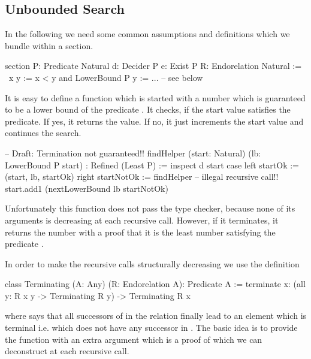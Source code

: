 \vskip 5mm
\subsection{Unbounded Search}

In the following we need some common assumptions and definitions which we
bundle within a section.

\begin{alba}
    section
        P: Predicate Natural
        d: Decider P
        e: Exist P
        R: Endorelation Natural :=
            \ x y := x < y and LowerBound P y
    :=
        ...  -- see below
\end{alba}

It is easy to define a function  which is started with a number
which is guaranteed to be a lower bound of the predicate . It checks, if
the start value satisfies the predicate. If yes, it returns the value. If no, it
just increments the start value and continues the search.
%
\begin{alba}
    -- Draft: Termination not guaranteed!!
    findHelper (start: Natural) (lb: LowerBound P start) : Refined (Least P) :=
        inspect d start case
            left startOk :=
                (start, lb, startOk)
            right startNotOk :=
                findHelper  -- illegal recursive call!!
                    start.add1
                    (nextLowerBound lb startNotOk)
\end{alba}
%
Unfortunately this function does not pass the type checker, because none of its
arguments is decreasing at each recursive call. However, if it terminates, it
returns the number with a proof that it is the least number satisfying the
predicate .

In order to make the recursive calls structurally decreasing we use the
definition
%
\begin{alba}
    class Terminating (A: Any) (R: Endorelation A): Predicate A :=
        terminate {x}:
            (all {y}: R x y -> Terminating R y)
            -> Terminating R x
\end{alba}
%
where  says that all successors of  in the
relation  finally lead to an element which is terminal i.e. which does
not have any successor in . The basic idea is to provide the function
 with an extra argument which is a proof of  which we can deconstruct at each recursive call.



